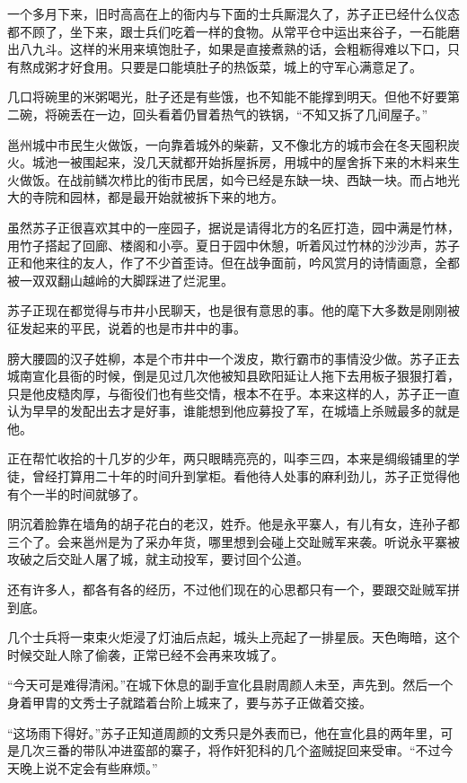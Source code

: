 一个多月下来，旧时高高在上的衙内与下面的士兵厮混久了，苏子正已经什么仪态都不顾了，坐下来，跟士兵们吃着一样的食物。从常平仓中运出来谷子，一石能磨出八九斗。这样的米用来填饱肚子，如果是直接煮熟的话，会粗粝得难以下口，只有熬成粥才好食用。只要是口能填肚子的热饭菜，城上的守军心满意足了。

几口将碗里的米粥喝光，肚子还是有些饿，也不知能不能撑到明天。但他不好要第二碗，将碗丢在一边，回头看着仍冒着热气的铁锅，“不知又拆了几间屋子。”

邕州城中市民生火做饭，一向靠着城外的柴薪，又不像北方的城市会在冬天囤积炭火。城池一被围起来，没几天就都开始拆屋拆房，用城中的屋舍拆下来的木料来生火做饭。在战前鳞次栉比的街市民居，如今已经是东缺一块、西缺一块。而占地光大的寺院和园林，都是最开始就被拆下来的地方。

虽然苏子正很喜欢其中的一座园子，据说是请得北方的名匠打造，园中满是竹林，用竹子搭起了回廊、楼阁和小亭。夏日于园中休憩，听着风过竹林的沙沙声，苏子正和他来往的友人，作了不少首歪诗。但在战争面前，吟风赏月的诗情画意，全都被一双双翻山越岭的大脚踩进了烂泥里。

苏子正现在都觉得与市井小民聊天，也是很有意思的事。他的麾下大多数是刚刚被征发起来的平民，说着的也是市井中的事。

膀大腰圆的汉子姓柳，本是个市井中一个泼皮，欺行霸市的事情没少做。苏子正去城南宣化县衙的时候，倒是见过几次他被知县欧阳延让人拖下去用板子狠狠打着，只是他皮糙肉厚，与衙役们也有些交情，根本不在乎。本来这样的人，苏子正一直认为早早的发配出去才是好事，谁能想到他应募投了军，在城墙上杀贼最多的就是他。

正在帮忙收拾的十几岁的少年，两只眼睛亮亮的，叫李三四，本来是绸缎铺里的学徒，曾经打算用二十年的时间升到掌柜。看他待人处事的麻利劲儿，苏子正觉得他有个一半的时间就够了。

阴沉着脸靠在墙角的胡子花白的老汉，姓乔。他是永平寨人，有儿有女，连孙子都三个了。会来邕州是为了采办年货，哪里想到会碰上交趾贼军来袭。听说永平寨被攻破之后交趾人屠了城，就主动投军，要讨回个公道。

还有许多人，都各有各的经历，不过他们现在的心思都只有一个，要跟交趾贼军拼到底。

几个士兵将一束束火炬浸了灯油后点起，城头上亮起了一排星辰。天色晦暗，这个时候交趾人除了偷袭，正常已经不会再来攻城了。

“今天可是难得清闲。”在城下休息的副手宣化县尉周颜人未至，声先到。然后一个身着甲胄的文秀士子就踏着台阶上城来了，要与苏子正做着交接。

“这场雨下得好。”苏子正知道周颜的文秀只是外表而已，他在宣化县的两年里，可是几次三番的带队冲进蛮部的寨子，将作奸犯科的几个盗贼捉回来受审。“不过今天晚上说不定会有些麻烦。”

